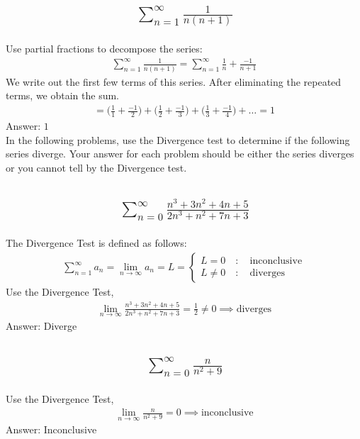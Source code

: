 \documentclass{article}
\begin{document}
\subsection{
	\begin{align*}
		\sum_{n = 1}^\infty \frac{1}{n(n + 1)}
	\end{align*}
}
Use partial fractions to decompose the series:
\begin{align*}
	\sum_{n = 1}^\infty \frac{1}{n(n + 1)} = \sum_{n = 1}^\infty \frac{1}{n} + \frac{-1}{n + 1}
\end{align*}
We write out the first few terms of this series. After eliminating the repeated terms, we obtain the sum.
\begin{align*}
	= \bigg( \frac{1}{1} + \frac{-1}{2} \bigg) + \bigg( \frac{1}{2} + \frac{-1}{3} \bigg) + \bigg( \frac{1}{3} + \frac{-1}{4} \bigg) + \dots = 1
\end{align*}
Answer: $1$
\\[10pt]
In the following problems, use the Divergence test to determine if the following series diverge. Your answer for each problem should be either the series diverges or you cannot tell by the Divergence test.

\subsection{
	\begin{align*}
		\sum_{n = 0}^\infty \frac{n^3 + 3n^2 + 4n + 5}{2n^3 + n^2 + 7n + 3}
	\end{align*}
}
The Divergence Test is defined as follows:
\begin{align*}
	\sum_{n = 1}^\infty a_n = \lim_{n \to \infty} a_n = L = 
	\begin{cases}
		L = 0 \quad : \quad \text{inconclusive} \\
		L \neq 0 \quad : \quad \text{diverges}
	\end{cases}
\end{align*}
Use the Divergence Test,
\begin{align*}
	\lim_{n \to \infty} \frac{n^3 + 3n^2 + 4n + 5}{2n^3 + n^2 + 7n + 3} = \frac{1}{2} \neq 0 \implies \text{diverges}
\end{align*}
Answer: Diverge

\subsection{
	\begin{align*}
		\sum_{n = 0}^\infty \frac{n}{n^2 + 9}
	\end{align*}
}
Use the Divergence Test,
\begin{align*}
	\lim_{n \to \infty} \frac{n}{n^2 + 9} = 0 \implies \text{inconclusive}
\end{align*}
Answer: Inconclusive
\end{document}
